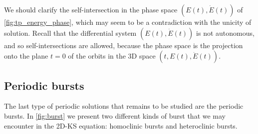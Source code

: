 \documentclass[twoside]{article}
\begin{document}
We should clarify the self-intersection in the phase space $(E(t), \dot{E}(t))$ of \cref{fig:tp_energy_phase}, which may seem to be a contradiction with the unicity of solution. Recall that the differential system $(E(t), \dot{E}(t))$ is not autonomous, and so self-intersections are allowed, because the phase space is the projection onto the plane $t=0$ of the orbits in the 3D space $(t,E(t), \dot{E}(t))$.

\subsection{Periodic bursts}\label{sec:periodic_bursts}
The last type of periodic solutions that remains to be studied are the periodic bursts. In \cref{fig:burst} we present two different kinds of burst that we may encounter in the 2D-KS equation: homoclinic bursts and heteroclinic bursts.
\end{document}
